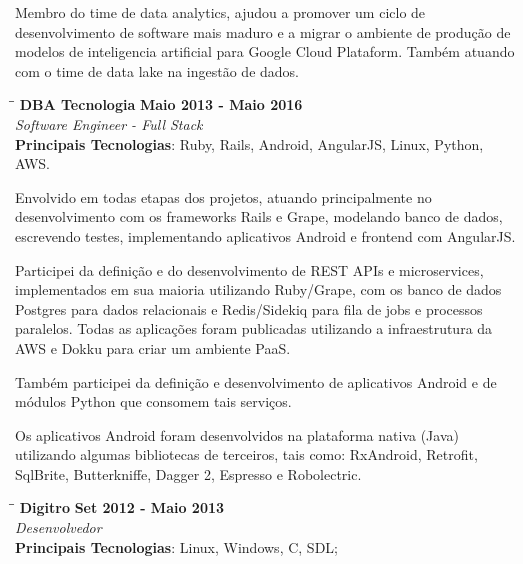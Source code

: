 \documentclass[margin]{res}
\begin{document}
\begin{resume}
    Membro do time de data analytics, ajudou a promover um ciclo de desenvolvimento de software mais maduro e a migrar o ambiente de produção de modelos de inteligencia artificial para Google Cloud Plataform.
    Também atuando com o time de data lake na ingestão de dados.



\vspace{-0.1in}
   \begin{tabbing}
   \hspace{2.3in}\= \hspace{1.7in}\= \kill %
    \textbf{DBA Tecnologia}    \>\>\textbf{Maio 2013 - Maio 2016}\\
    \textit{Software Engineer - Full Stack}\\
    \textbf{Principais Tecnologias}: Ruby, Rails, Android, AngularJS, Linux, Python, AWS.
   \end{tabbing}\vspace{-20pt}      %
    \vspace{2mm}
    
	Envolvido em todas etapas dos projetos, atuando principalmente no desenvolvimento com os frameworks Rails e Grape, modelando banco de dados, escrevendo testes, implementando aplicativos Android e frontend com AngularJS.

Participei da definição e do desenvolvimento de REST APIs e microservices, implementados em sua maioria utilizando Ruby/Grape, com os banco de dados Postgres para dados relacionais e Redis/Sidekiq para fila de jobs e processos paralelos. Todas as aplicações foram publicadas utilizando a infraestrutura da AWS e Dokku para criar um ambiente PaaS.

Também participei da definição e desenvolvimento de aplicativos Android e de módulos Python que consomem tais serviços.

Os aplicativos Android foram desenvolvidos na plataforma nativa (Java) utilizando algumas bibliotecas de terceiros, tais como: RxAndroid, Retrofit, SqlBrite, Butterkniffe, Dagger 2, Espresso e Robolectric.

\vspace{-0.1in}
   \begin{tabbing}
   \hspace{2.3in}\= \hspace{1.7in}\= \kill %
    \textbf{Digitro}    \>\>\textbf{Set 2012 - Maio 2013}\\
    \textit{Desenvolvedor}\\
    \textbf{Principais Tecnologias}: Linux, Windows, C, SDL;
   \end{tabbing}\vspace{-20pt}      %
    \vspace{2mm}
    

\end{resume}
\end{document}
